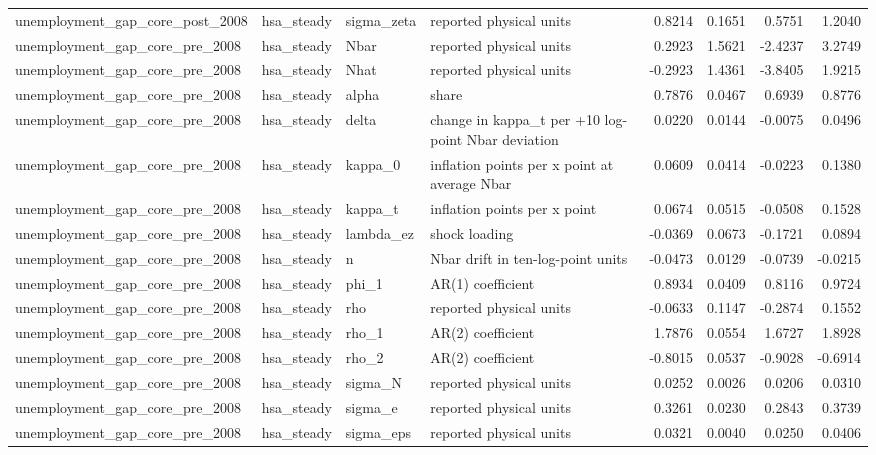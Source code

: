 \begin{tabular}{llllrrrr}
unemployment\_gap\_core\_post\_2008 & hsa\_steady & sigma\_zeta & reported physical units & 0.8214 & 0.1651 & 0.5751 & 1.2040 \\
unemployment\_gap\_core\_pre\_2008 & hsa\_steady & Nbar & reported physical units & 0.2923 & 1.5621 & -2.4237 & 3.2749 \\
unemployment\_gap\_core\_pre\_2008 & hsa\_steady & Nhat & reported physical units & -0.2923 & 1.4361 & -3.8405 & 1.9215 \\
unemployment\_gap\_core\_pre\_2008 & hsa\_steady & alpha & share & 0.7876 & 0.0467 & 0.6939 & 0.8776 \\
unemployment\_gap\_core\_pre\_2008 & hsa\_steady & delta & change in kappa\_t per +10 log-point Nbar deviation & 0.0220 & 0.0144 & -0.0075 & 0.0496 \\
unemployment\_gap\_core\_pre\_2008 & hsa\_steady & kappa\_0 & inflation points per x point at average Nbar & 0.0609 & 0.0414 & -0.0223 & 0.1380 \\
unemployment\_gap\_core\_pre\_2008 & hsa\_steady & kappa\_t & inflation points per x point & 0.0674 & 0.0515 & -0.0508 & 0.1528 \\
unemployment\_gap\_core\_pre\_2008 & hsa\_steady & lambda\_ez & shock loading & -0.0369 & 0.0673 & -0.1721 & 0.0894 \\
unemployment\_gap\_core\_pre\_2008 & hsa\_steady & n & Nbar drift in ten-log-point units & -0.0473 & 0.0129 & -0.0739 & -0.0215 \\
unemployment\_gap\_core\_pre\_2008 & hsa\_steady & phi\_1 & AR(1) coefficient & 0.8934 & 0.0409 & 0.8116 & 0.9724 \\
unemployment\_gap\_core\_pre\_2008 & hsa\_steady & rho & reported physical units & -0.0633 & 0.1147 & -0.2874 & 0.1552 \\
unemployment\_gap\_core\_pre\_2008 & hsa\_steady & rho\_1 & AR(2) coefficient & 1.7876 & 0.0554 & 1.6727 & 1.8928 \\
unemployment\_gap\_core\_pre\_2008 & hsa\_steady & rho\_2 & AR(2) coefficient & -0.8015 & 0.0537 & -0.9028 & -0.6914 \\
unemployment\_gap\_core\_pre\_2008 & hsa\_steady & sigma\_N & reported physical units & 0.0252 & 0.0026 & 0.0206 & 0.0310 \\
unemployment\_gap\_core\_pre\_2008 & hsa\_steady & sigma\_e & reported physical units & 0.3261 & 0.0230 & 0.2843 & 0.3739 \\
unemployment\_gap\_core\_pre\_2008 & hsa\_steady & sigma\_eps & reported physical units & 0.0321 & 0.0040 & 0.0250 & 0.0406 \\

\end{tabular}
